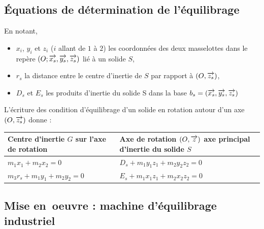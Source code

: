 \documentclass[10pt,fleqn]{article} %
\begin{document}
\subsection{Équations de détermination de l'équilibrage}

\begin{definition}

En notant,
\begin{itemize}
\item $x_i$, $y_i$ et $z_i$ ($i$ allant de $1$ à $2$) les coordonnées des deux masselottes dans le repère $\left(O;\overrightarrow{x_s},\overrightarrow{y_s},\overrightarrow{z_s} \right)$ lié à un solide $S$,
\item $r_s$ la distance entre le centre d'inertie de $S$ par rapport à $\left(O,\overrightarrow{{z}_s}\right)$, 
\item $D_s$ et $E_s$ les produits d'inertie du solide S dans la base $b_s=\left(\overrightarrow{{x}_s},\overrightarrow{{y}_s},\overrightarrow{{z}_s} \right)$
\end{itemize}
L'écriture des condition d'équilibrage d'un solide en rotation autour d'un axe $\left(O,\overrightarrow{{z}_s}\right)$ donne : 

\begin{tabular}{|p{6.5cm}|p{6.5cm}|}
\hline 
\textbf{Centre d'inertie $G$ sur l'axe de rotation} & \textbf{Axe de rotation $\left(O,\overrightarrow{{z}}\right)$ axe principal d'inertie du solide $S$} \\ 
\hline 
$m_1 x_1+m_2 x_2=0$
&
$D_s+m_1 y_1 z_1+ m_2 y_2 z_2 = 0$
\\ 
$m_3 r_s+m_1 y_1+m_2 y_2=0$
&
$E_s+m_1 x_1 z_1+m_2 x_2 z_2 = 0$\\
\hline 
\end{tabular} 

\end{definition}

\subsection{Mise en\ oe{}uvre : machine d'équilibrage industriel}
\end{document}
